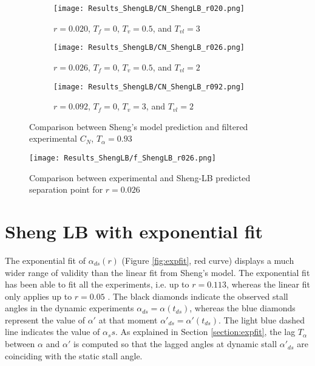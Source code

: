 \begin{figure}[h]
    \begin{subfigure}{\textwidth}
        \centering
        \texttt{[image: Results\_ShengLB/CN\_ShengLB\_r020.png]}
        \caption{$r = 0.020$, $T_f=0$, $T_v=0.5$, and $T_{vl}=3$}
        \label{fig:CN_ShengLB_r020}
    \end{subfigure}
    \begin{subfigure}{\textwidth}
        \centering
        \texttt{[image: Results\_ShengLB/CN\_ShengLB\_r026.png]}
        \caption{$r = 0.026$, $T_f=0$, $T_v=0.5$, and $T_{vl}=2$}
        \label{fig:CN_ShengLB_r026}
    \end{subfigure}
    \begin{subfigure}{\textwidth}
        \centering
        \texttt{[image: Results\_ShengLB/CN\_ShengLB\_r092.png]}
        \caption{$r = 0.092$, $T_f=0$, $T_v=3$, and $T_{vl}=2$}
        \label{fig:CN_ShengLB_r092}
    \end{subfigure}
    \caption{Comparison between Sheng's model prediction and filtered experimental $C_N$, $T_\alpha=0.93$}
    \label{fig:CN_ShengLB}
\end{figure}



\begin{figure}[h]
    \centering
    \texttt{[image: Results\_ShengLB/f\_ShengLB\_r026.png]}
    \caption{Comparison between experimental and Sheng-LB predicted separation point for $r = 0.026$}
    \label{fig:f_ShengLB_r026}
\end{figure}

\section{Sheng LB with exponential fit}

The exponential fit of $\alpha_{ds}(r)$ (Figure \ref{fig:expfit}, red curve) displays a much wider range of validity than the linear fit from Sheng's model. The exponential fit has been able to fit all the experiments, i.e. up to $r=0.113$, whereas the linear fit only applies up to $r=0.05$ \cite{sheng_new_2006}. The black diamonds indicate the observed stall angles in the dynamic experiments $\alpha_{ds} = \alpha(t_{ds})$, whereas the blue diamonds represent the value of $\alpha'$ at that moment $\alpha'_{ds} = \alpha'(t_{ds})$. The light blue dashed line indicates the value of $\alpha_ss$. As explained in Section \ref{section:expfit}, the lag $T_\alpha$ between $\alpha$ and $\alpha'$ is computed so that the lagged angles at dynamic stall $\alpha'_{ds}$ are coinciding with the static stall angle.

